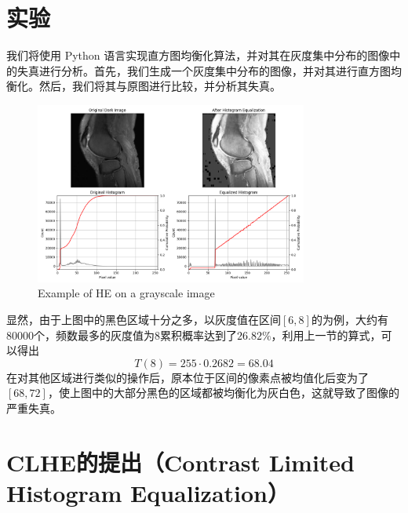 \documentclass{ctexart}
\begin{document}
\section{实验}
   我们将使用 Python 语言实现直方图均衡化算法，并对其在灰度集中分布的图像中的失真进行分析。首先，我们生成一个灰度集中分布的图像，并对其进行直方图均衡化。然后，我们将其与原图进行比较，并分析其失真。
\begin{figure}[http]
        \centering
      
    \includegraphics[width=0.8\textwidth]{Figure_1.png}
       \caption{Example of HE on a grayscale image}
    \end{figure}
   
显然，由于上图中的黑色区域十分之多，以灰度值在区间$[6,8]$的为例，大约有$80000$个，频数最多的灰度值为$8$累积概率达到了$26.82\%$，利用上一节的算式，可以得出\[T(8)=255\cdot 0.2682=68.04\]
在对其他区域进行类似的操作后，原本位于区间的像素点被均值化后变为了$[68,72]$，使上图中的大部分黑色的区域都被均衡化为灰白色，这就导致了图像的严重失真。
\newpage
\section{CLHE的提出（Contrast Limited Histogram Equalization）}
\end{document}
